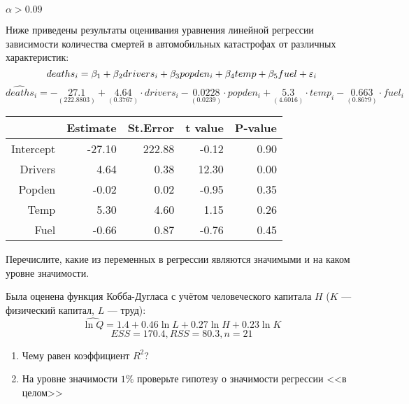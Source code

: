 \documentclass[pdftex,11pt,openany]{book}\usepackage[]{graphicx}\usepackage[]{color}
\begin{document}
\begin{solution}
$\alpha>0.09$
\end{solution}


\begin{problem}
 Ниже приведены результаты оценивания уравнения линейной регрессии зависимости количества смертей в автомобильных катастрофах от различных характеристик:
\[
deaths_i = \beta_1 + \beta_2 drivers_i + \beta_3 popden_i + \beta_4  temp + \beta_5 fuel + \varepsilon_i
\]
\ensuremath{\widehat{deaths}_i=-\underset{(222.8803)}{27.1}+\underset{(  0.3767)}{4.64}\cdot drivers_i-\underset{(  0.0239)}{0.0228}\cdot popden_i+\underset{(  4.6016)}{5.3}\cdot temp_i-\underset{(  0.8679)}{0.663}\cdot fuel_i}%
\begin{table}[ht]
\centering
\begin{tabular}{rrrrr}
  \hline
 & Estimate & St.Error & t value & P-value \\ 
  \hline
Intercept & -27.10 & 222.88 & -0.12 & 0.90 \\ 
  Drivers & 4.64 & 0.38 & 12.30 & 0.00 \\ 
  Popden & -0.02 & 0.02 & -0.95 & 0.35 \\ 
  Temp & 5.30 & 4.60 & 1.15 & 0.26 \\ 
  Fuel & -0.66 & 0.87 & -0.76 & 0.45 \\ 
   \hline
\end{tabular}
\end{table}


Перечислите, какие из переменных в регрессии являются значимыми и на каком уровне значимости.
\end{problem}

\begin{solution}
\end{solution}


\begin{problem}
 Была оценена функция Кобба-Дугласа с учётом человеческого капитала $H$ ($K$ --- физический капитал, $L$ --- труд): 
\[ 
\widehat{\ln Q} = 1.4 + 0.46\ln L + 0.27\ln H + 0.23\ln K
\] 
\[
ESS = 170.4, RSS = 80.3, n = 21
\]
\begin{enumerate}
\item Чему равен коэффициент $R^2$?
\item На уровне значимости $1\%$ проверьте гипотезу о значимости регрессии <<в целом>>
\end{enumerate}
\end{problem}
\end{document}
